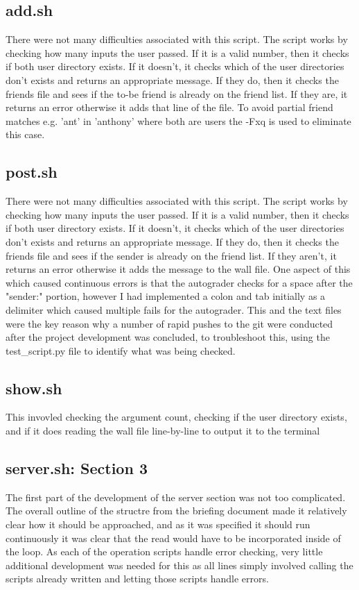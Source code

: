 \documentclass[11pt]{article}
\theoremstyle{plain}
\theoremstyle{definition}
\begin{document}
\subsection{add.sh}\label{subsection: Add}
There were not many difficulties associated with this script. The script works by checking how many inputs the user passed. If it is a valid number, then it checks if both user directory exists. If it doesn't, it checks which of the user directories don't exists and returns an appropriate message. If they do, then it checks the friends file and sees if the to-be friend is already on the friend list. If they are, it returns an error otherwise it adds that line of the file. To avoid partial friend matches e.g. 'ant' in 'anthony' where both are users the -Fxq is used to eliminate this case.


\subsection{post.sh}\label{subsection: Post}
There were not many difficulties associated with this script. The script works by checking how many inputs the user passed. If it is a valid number, then it checks if both user directory exists. If it doesn't, it checks which of the user directories don't exists and returns an appropriate message. If they do, then it checks the friends file and sees if the sender is already on the friend list. If they aren't, it returns an error otherwise it adds the message to the wall file. One aspect of this which caused continuous errors is that the autograder checks for a space after the "sender:" portion, however I had implemented a colon and tab initially as a delimiter which caused multiple fails for the autograder. This and the text files were the key reason why a number of rapid pushes to the git were conducted after the project development was concluded, to troubleshoot this, using the test\_script.py file to identify what was being checked.


\subsection{show.sh}\label{subsection: Show}
This invovled checking the argument count, checking if the user directory exists, and if it does reading the wall file line-by-line to output it to the terminal

\subsection{server.sh: Section 3}\label{subsection: server1}
The first part of the development of the server section was not too complicated. The overall outline of the structre from the briefing document made it relatively clear how it should be approached, and as it was specified it should run continuously it was clear that the read would have to be incorporated inside of the loop. As each of the operation scripts handle error checking, very little additional development was needed for this as all lines simply involved calling the scripts already written and letting those scripts handle errors.
\end{document}
